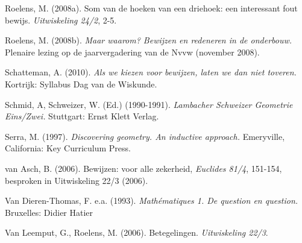 \begin{bronnen}
\item Roelens, M. (2008a). Som van de hoeken van een driehoek: een interessant fout bewijs. \emph{Uitwiskeling 24/2}, 2-5.
\item Roelens, M. (2008b). \emph{Maar waarom? Bewijzen en redeneren in de onderbouw.} Plenaire lezing op de jaarvergadering van de Nvvw (november 2008).
\item Schatteman, A. (2010). \emph{Als we kiezen voor bewijzen, laten we dan niet toveren.} Kortrijk: Syllabus Dag van de Wiskunde.
\item Schmid, A, Schweizer, W. (Ed.) (1990-1991). \emph{Lambacher Schweizer Geometrie Eins/Zwei.} Stuttgart: Ernst Klett Verlag.
\item Serra, M. (1997). \emph{Discovering geometry. An inductive approach.} Emeryville, California: Key Curriculum Press.
\item van Asch, B. (2006). Bewijzen: voor alle zekerheid, \emph{Euclides 81/4}, 151-154, besproken in Uitwiskeling 22/3 (2006).
\item Van Dieren-Thomas, F. e.a. (1993). \emph{Mathématiques 1. De question en question.} Bruxelles: Didier Hatier
\item Van Leemput, G., Roelens, M. (2006). Betegelingen. \emph{Uitwiskeling 22/3}.

\end{bronnen}

